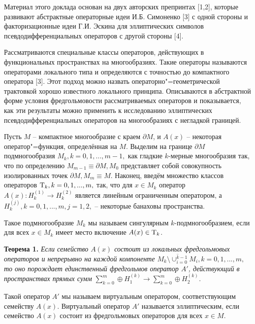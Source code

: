 \vzmscaption

Материал этого доклада основан на двух авторских препринтах [1,2], которые развивают абстрактные операторные идеи И.Б. Симоненко [3] с одной стороны и факторизационные идеи Г.И. Эскина для эллиптических символов псевдодифференциальных операторов с другой стороны [4].

Рассматриваются специальные классы операторов, действующих в функциональных пространствах на многообразиях. Такие операторы называются операторами локального типа и определяются с точностью до компактного оператора [3]. Этот подход можно назвать операторно"=геометрической трактовкой хорошо известного локального принципа. Описываются в абстрактной форме условия фредгольмовости рассматриваемых операторов и показывается, как эти результаты можно применить к исследованию эллиптических псевдодифференциальных операторов на многообразиях с негладкой границей.

Пусть $M$ -- компактное многообразие с краем $\partial M$, и $A(x)$ -- некоторая оператор"=функция, определённая на $M$. Выделим на границе $\partial M$ подмногообразия $M_k, k=0,1,...,m-1,$ как гладкие $k$-мерные многообразия так, что по определению $M_{m-1}\equiv\partial M, M_0$ представляет собой совокупность изолированных точек $\partial M, M_m\equiv M$. Наконец, введём множество классов операторов ${\rm T}_k, k=0,1,...,m,$ так, что для $x\in M_k$ оператор $A(x): H^{(1)}_k\rightarrow H^{(2)}_k$ является линейным ограниченным оператором, а $H^{(j)}_k, k=0,1,...,m, j=1,2,$ -- некоторые банаховы пространства.


Такое подмногообразие $M_k$ мы называем сингулярным $k$-подмногообразием, если для всех $x\in M_k$ имеет место включение $A(x)\in{\rm T}_k$.

\textbf{Теорема 1.} {\it
Если семейство $A(x)$ состоит из локальных фредгольмовых операторов и непрерывно на каждой компоненте $\overline{M_k\setminus\cup_{i=0}^{k-1}M_i}, k=0,1,...,m,$ то оно порождает единственный фредгольмов оператор
$A'$, действующий в пространствах прямых сумм $\sum\limits_{k=0}^m\oplus H^{(k)}_1\rightarrow\sum\limits_{k=0}^m\oplus H^{(k)}_2$.
}


Такой оператор $A'$ мы называем виртуальным оператором, соответствующим семейству $A(x)$. Виртуальный оператор $A'$ называется эллиптическим, если семейство $A(x)$ состоит из фредгольмовых операторов для всех $x\in M$.


